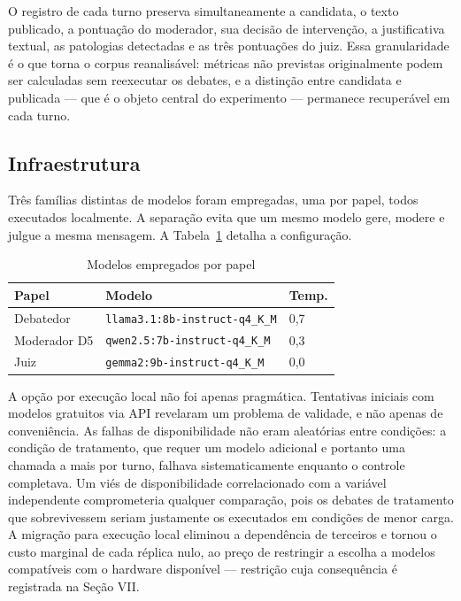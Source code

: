 \documentclass[conference]{IEEEtran} \IEEEoverridecommandlockouts %
\begin{document}
O registro de cada turno preserva simultaneamente a candidata, o texto
publicado, a pontuação do moderador, sua decisão de intervenção, a justificativa
textual, as patologias detectadas e as três pontuações do juiz. Essa
granularidade é o que torna o corpus reanalisável: métricas não previstas
originalmente podem ser calculadas sem reexecutar os debates, e a distinção
entre candidata e publicada — que é o objeto central do experimento —
permanece recuperável em cada turno.

\subsection{Infraestrutura}

Três famílias distintas de modelos foram empregadas, uma por papel, todos
executados localmente. A separação evita que um mesmo modelo gere, modere e
julgue a mesma mensagem. A Tabela~\ref{tab:modelos} detalha a configuração.

\begin{table}[htbp]
\caption{Modelos empregados por papel}
\begin{center}
\begin{tabular}{@{}lll@{}}
\toprule
\textbf{Papel} & \textbf{Modelo} & \textbf{Temp.} \\
\midrule
Debatedor & \texttt{llama3.1:8b-instruct-q4\_K\_M} & 0,7 \\
Moderador D5 & \texttt{qwen2.5:7b-instruct-q4\_K\_M} & 0,3 \\
Juiz & \texttt{gemma2:9b-instruct-q4\_K\_M} & 0,0 \\
\bottomrule
\end{tabular}
\label{tab:modelos}
\end{center}
\end{table}

A opção por execução local não foi apenas pragmática. Tentativas iniciais com
modelos gratuitos via API revelaram um problema de validade, e não apenas de
conveniência. As falhas de disponibilidade não eram aleatórias entre condições:
a condição de tratamento, que requer um modelo adicional e portanto uma
chamada a mais por turno, falhava sistematicamente enquanto o controle
completava. Um viés de disponibilidade correlacionado com a variável
independente comprometeria qualquer comparação, pois os debates de tratamento
que sobrevivessem seriam justamente os executados em condições de menor carga.
A migração para execução local eliminou a dependência de terceiros e tornou o
custo marginal de cada réplica nulo, ao preço de restringir a escolha a modelos
compatíveis com o hardware disponível — restrição cuja consequência é
registrada na Seção VII.
\end{document}
